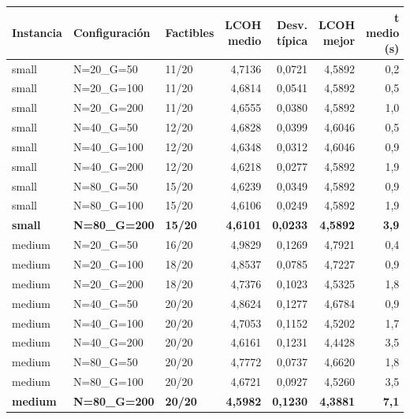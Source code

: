 \begin{table}[H]
    \centering
    \small
    \renewcommand{\arraystretch}{1.25}
    \begin{tabular}{lllrrrr}
        \hline
        \textbf{Instancia} & \textbf{Configuración} & \textbf{Factibles} & \textbf{LCOH medio} & \textbf{Desv. típica} & \textbf{LCOH mejor} & \textbf{t medio (s)} \\
        \hline
        small & N=20\_G=50 & 11/20 & 4,7136 & 0,0721 & 4,5892 & 0,2 \\
        small & N=20\_G=100 & 11/20 & 4,6814 & 0,0541 & 4,5892 & 0,5 \\
        small & N=20\_G=200 & 11/20 & 4,6555 & 0,0380 & 4,5892 & 1,0 \\
        small & N=40\_G=50 & 12/20 & 4,6828 & 0,0399 & 4,6046 & 0,5 \\
        small & N=40\_G=100 & 12/20 & 4,6348 & 0,0312 & 4,6046 & 0,9 \\
        small & N=40\_G=200 & 12/20 & 4,6218 & 0,0277 & 4,5892 & 1,9 \\
        small & N=80\_G=50 & 15/20 & 4,6239 & 0,0349 & 4,5892 & 0,9 \\
        small & N=80\_G=100 & 15/20 & 4,6106 & 0,0249 & 4,5892 & 1,9 \\
        \textbf{small} & \textbf{N=80\_G=200} & \textbf{15/20} & \textbf{4,6101} & \textbf{0,0233} & \textbf{4,5892} & \textbf{3,9} \\
        \hline
        medium & N=20\_G=50 & 16/20 & 4,9829 & 0,1269 & 4,7921 & 0,4 \\
        medium & N=20\_G=100 & 18/20 & 4,8537 & 0,0785 & 4,7227 & 0,9 \\
        medium & N=20\_G=200 & 18/20 & 4,7376 & 0,1023 & 4,5325 & 1,8 \\
        medium & N=40\_G=50 & 20/20 & 4,8624 & 0,1277 & 4,6784 & 0,9 \\
        medium & N=40\_G=100 & 20/20 & 4,7053 & 0,1152 & 4,5202 & 1,7 \\
        medium & N=40\_G=200 & 20/20 & 4,6161 & 0,1231 & 4,4428 & 3,5 \\
        medium & N=80\_G=50 & 20/20 & 4,7772 & 0,0737 & 4,6620 & 1,8 \\
        medium & N=80\_G=100 & 20/20 & 4,6721 & 0,0927 & 4,5260 & 3,5 \\
        \textbf{medium} & \textbf{N=80\_G=200} & \textbf{20/20} & \textbf{4,5982} & \textbf{0,1230} & \textbf{4,3881} & \textbf{7,1} \\
        \hline

\end{tabular}
\end{table}
